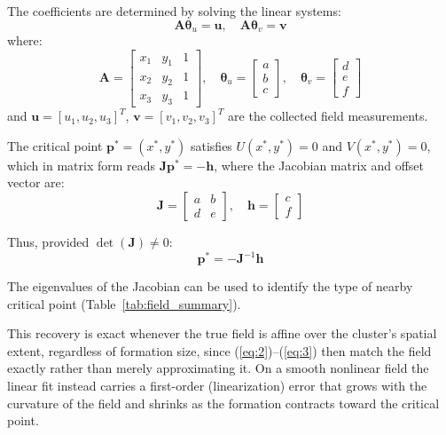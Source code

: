 \documentclass[lettersize,journal]{IEEEtran}
\begin{document}
The coefficients are determined by solving the linear systems:
\begin{equation}\label{eq:4}
\mathbf{A}\boldsymbol{\theta}_u = \mathbf{u}, \quad \mathbf{A}\boldsymbol{\theta}_v = \mathbf{v}
\end{equation}
where:
\begin{equation}\label{eq:5}
\mathbf{A} = \begin{bmatrix} x_1 & y_1 & 1 \\ x_2 & y_2 & 1 \\ x_3 & y_3 & 1 \end{bmatrix}, \quad \boldsymbol{\theta}_u = \begin{bmatrix} a \\ b \\ c \end{bmatrix}, \quad \boldsymbol{\theta}_v = \begin{bmatrix} d \\ e \\ f \end{bmatrix}
\end{equation}
and $\mathbf{u} = [u_1, u_2, u_3]^T$, $\mathbf{v} = [v_1, v_2, v_3]^T$ are the collected field measurements.

The critical point $\mathbf{p}^* = (x^*, y^*)$ satisfies $U(x^*, y^*) = 0$ and $V(x^*, y^*) = 0$, which in matrix form reads $\mathbf{J}\mathbf{p}^* = -\mathbf{h}$, where the Jacobian matrix and offset vector are:
\begin{equation}\label{eq:8}
\mathbf{J} = \begin{bmatrix} a & b \\ d & e \end{bmatrix}, \quad \mathbf{h} = \begin{bmatrix} c \\ f \end{bmatrix}
\end{equation}

Thus, provided $\det(\mathbf{J}) \neq 0$:
\begin{equation}\label{eq:9}
\mathbf{p}^* = -\mathbf{J}^{-1}\mathbf{h}
\end{equation}

The eigenvalues of the Jacobian can be used to identify the type of nearby critical point (Table~\ref{tab:field_summary}).

This recovery is exact whenever the true field is affine over the cluster's spatial extent, regardless of formation size, since (\ref{eq:2})--(\ref{eq:3}) then match the field exactly rather than merely approximating it. On a smooth nonlinear field the linear fit instead carries a first-order (linearization) error that grows with the curvature of the field and shrinks as the formation contracts toward the critical point.
\end{document}
